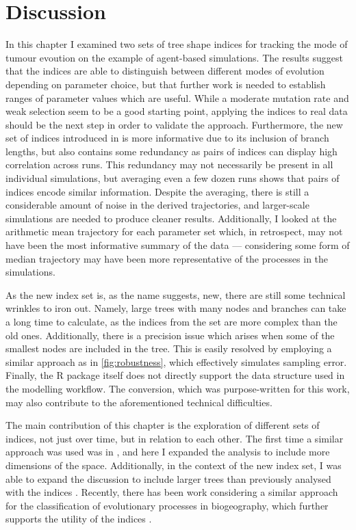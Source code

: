 \section{Discussion}
In this chapter I examined two sets of tree shape indices for tracking the mode
of tumour evoution on the example of agent-based simulations. The results
suggest that the indices are able to distinguish between different modes of
evolution depending on parameter choice, but that further work is needed to
establish ranges of parameter values which are useful. While a moderate
mutation rate and weak selection seem to be a good starting point, applying the
indices to real data should be the next step in order to validate the approach.
Furthermore, the new set of indices introduced in \cite{noble_new_2023} is more
informative due to its inclusion of branch lengths, but also
contains some redundancy as pairs of indices can display high correlation
across runs. This redundancy may not necessarily be present in all individual
simulations, but averaging even a few dozen runs shows that pairs of indices
encode similar information. Despite the averaging, there is still a
considerable amount of noise in the derived trajectories, and larger-scale
simulations are needed to produce cleaner results. Additionally, I looked at the
arithmetic mean trajectory for each parameter set which, in retrospect, may not
have been the most informative summary of the data --- considering some form of
median trajectory may have been more representative of the processes in the
simulations. \par
As the new index set is, as the name suggests, new, there are still some
technical wrinkles to iron out. Namely, large trees with many nodes and branches
can take a long time to calculate, as the indices from the set are more complex
than the old ones. Additionally, there is a precision issue which arises when
some of the smallest nodes are included in the tree. This is easily resolved by
employing a similar approach as in \ref{fig:robustness}, which effectively
simulates sampling error. Finally, the R package itself does not directly
support the data structure used in the modelling workflow. The conversion, which
was purpose-written for this work, may also contribute to the aforementioned
technical difficulties. \par

The main contribution of this chapter is the exploration of different sets of
indices, not just over time, but in relation to each other. The first time a
similar approach was used was in \cite{noble_spatial_2022}, and here I expanded
the analysis to include more dimensions of the space. Additionally, in the
context of the new index set, I was able to expand the discussion to include
larger trees than previously analysed with the indices \cite{noble_new_2023}.
Recently, there has been work considering a similar approach for the
classification of evolutionary processes in biogeography, which further supports
the utility of the indices \cite{freitas_patch_2024}. \par

